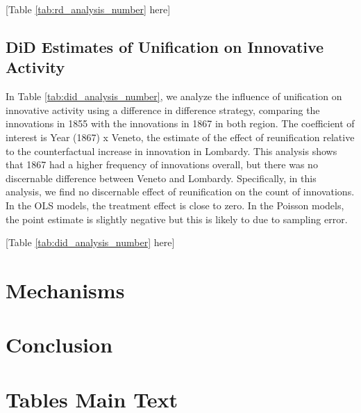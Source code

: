 \begin{center}
    [Table \ref{tab:rd_analysis_number} here]
\end{center}

\subsection{DiD Estimates of Unification on Innovative Activity}

In Table \ref{tab:did_analysis_number}, we analyze the influence of unification on innovative activity using a difference in difference strategy, comparing the innovations in 1855 with the innovations in 1867 in both region. The coefficient of interest is Year (1867) x Veneto, the estimate of the effect of reunification relative to the counterfactual increase in innovation in Lombardy. This analysis shows that 1867 had a higher frequency of innovations overall, but there was no discernable difference between Veneto and Lombardy. Specifically, in this analysis, we find no discernable effect of reunification on the count of innovations. In the OLS models, the treatment effect is close to zero. In the Poisson models, the point estimate is slightly negative but this is likely to due to sampling error. 

\begin{center}
    [Table \ref{tab:did_analysis_number} here]
\end{center}

\section{Mechanisms}







\section{Conclusion}




\clearpage

\appendix

\section{Tables Main Text}


\clearpage


\clearpage


\clearpage

